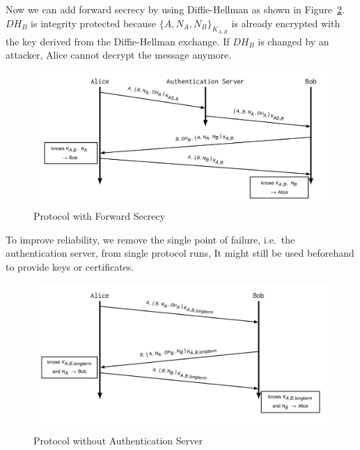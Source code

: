 Now we can add forward secrecy by using Diffie-Hellman as shown in Figure~\ref{fig:ooppt3}.
$DH_B$ is integrity protected because $\{A, N_A, N_B\}_{K_{A,B}}$ is already encrypted with the key derived from the Diffie-Hellman exchange.
If $DH_B$ is changed by an attacker, Alice cannot decrypt the message anymore.
\begin{figure}[H]
  \centering
  \includegraphics[width=\textwidth]{figures/ooppt3.png}
  \caption{Protocol with Forward Secrecy}\label{fig:ooppt3}
\end{figure}

To improve reliability, we remove the single point of failure, i.e.\ the authentication server, from single protocol runs, 
It might still be used beforehand to provide keys or certificates.
\begin{figure}[H]
  \centering
  \includegraphics[width=\textwidth]{figures/ooppt4.png}
  \caption{Protocol without Authentication Server}\label{fig:ooppt3}
\end{figure}
\newpage

